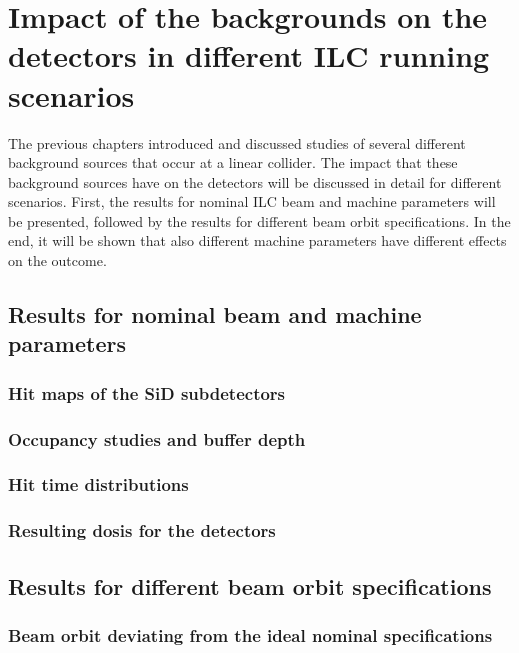 \chapter{Impact of the backgrounds on the detectors in different ILC running scenarios}
\label{EffectDetectors}
The previous chapters introduced and discussed studies of several different background sources that occur at a linear collider.
The impact that these background sources have on the detectors will be discussed in detail for different scenarios.
First, the results for nominal ILC beam and machine parameters will be presented, followed by the results for different beam orbit specifications.
In the end, it will be shown that also different machine parameters have different effects on the outcome.

\section{Results for nominal beam and machine parameters}
\label{EffectDetectors:Nominal}
\subsection{Hit maps of the SiD subdetectors}
\label{EffectDetectors:hitmaps}
\subsection{Occupancy studies and buffer depth}
\label{EffectDetectors:occupancy}
\subsection{Hit time distributions}
\label{EffectDetectors:hittime}
\subsection{Resulting dosis for the detectors}
\label{EffectDetectors:dosis}

\section{Results for different beam orbit specifications}
\label{EffectDetectors:BeamOrbit}

\subsection{Beam orbit deviating from the ideal nominal specifications}
\label{EffectDetectors:BeamOrbit:otherspecs}
